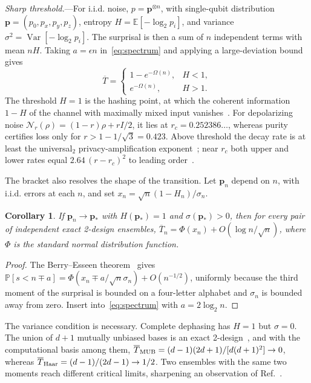 \documentclass[aps,prl,reprint,superscriptaddress,amsmath,amssymb]{revtex4-2}
\newtheorem{corollary}{Corollary}
\newcommand{\E}{\mathbb E}
\newcommand{\Tb}{\overline T}
\newcommand{\N}{\mathcal N}
\newcommand{\prob}{\mathbb P}
\begin{document}
\emph{Sharp threshold.}---For i.i.d. noise, $p=\bm p^{\otimes n}$, with
single-qubit distribution $\bm p=(p_0,p_x,p_y,p_z)$, entropy
$H=\E[-\log_2p_i]$, and variance $\sigma^2=\operatorname{Var}[-\log_2p_i]$. The
surprisal is then a sum of $n$ independent terms with mean $nH$. Taking
$a=\epsilon n$ in~\eqref{eq:spectrum} and applying a large-deviation
bound~\cite{CoverThomas} gives
\begin{equation}
\Tb=\begin{cases}1-e^{-\Omega(n)},&H<1,\\ e^{-\Omega(n)},&H>1.\end{cases}
\label{eq:threshold}
\end{equation}
The threshold $H=1$ is the hashing point, at which the coherent information
$1-H$ of the channel with maximally mixed input vanishes~\cite{Bennett,Devetak}.
For depolarizing noise $\N_r(\rho)=(1-r)\rho+rI/2$, it lies at
$r_c=0.252386\ldots$, whereas purity certifies loss only for
$r>1-1/\sqrt3=0.423$. Above threshold the decay rate is at least the
universal$_2$ privacy-amplification exponent~\cite{Hayashi,Dupuis}; near
$r_c$ both upper and lower rates equal $2.64\,(r-r_c)^2$ to leading
order~\cite{DataRepo}.

The bracket also resolves the shape of the transition. Let $\bm p_n$ depend on
$n$, with i.i.d. errors at each $n$, and set $x_n=\sqrt n(1-H_n)/\sigma_n$.

\begin{corollary}
If $\bm p_n\to\bm p_*$ with $H(\bm p_*)=1$ and $\sigma(\bm p_*)>0$, then for
every pair of independent exact 2-design ensembles,
$\Tb_n=\Phi(x_n)+O(\log n/\sqrt n)$, where $\Phi$ is the standard normal
distribution function.
\end{corollary}

\begin{proof}
The Berry--Esseen theorem~\cite{BerryEsseen} gives
$\prob[s<n\mp a]=\Phi(x_n\mp a/\sqrt n\sigma_n)+O(n^{-1/2})$, uniformly because
the third moment of the surprisal is bounded on a four-letter alphabet and
$\sigma_n$ is bounded away from zero. Insert into~\eqref{eq:spectrum} with
$a=2\log_2n$.
\end{proof}

The variance condition is necessary. Complete dephasing has $H=1$ but
$\sigma=0$. The union of $d+1$ mutually unbiased bases is an exact
2-design~\cite{MUB}, and with the computational basis among them,
$\Tb_{\rm MUB}=(d-1)(2d+1)/[d(d+1)^2]\to0$, whereas
$\Tb_{\rm Haar}=(d-1)/(2d-1)\to1/2$. Two ensembles with the same two moments
reach different critical limits, sharpening an observation of
Ref.~\cite{Ibarrondo}.
\end{document}
